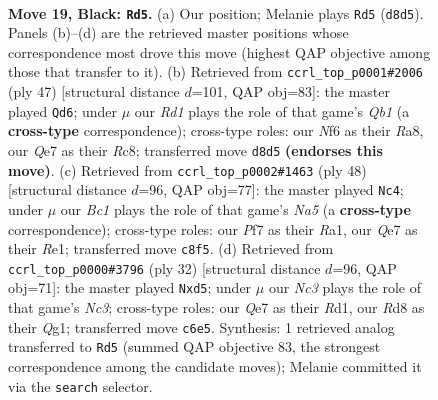\documentclass[11pt]{article}
\begin{document}
\clearpage

\begin{figure}[p]\centering
\begin{subfigure}{0.46\textwidth}\centering
\resizebox{\linewidth}{!}{%
\newchessgame
\chessboard[
  setfen={2br4/1p2qpkp/r1n2np1/p3B1Q1/P7/1P3NP1/5PBP/RN2R1K1 b - - 0 19},
  showmover=false,
  pgfstyle=straightmove, color=movearrow, markmove={d8-d5}
]}
\caption{}
\end{subfigure}\hfill
\begin{subfigure}{0.46\textwidth}\centering
\resizebox{\linewidth}{!}{%
\newchessgame
\chessboard[
  setfen={rqr3k1/4ppbp/2B2np1/p7/1pQB1n2/5N2/PP3PPP/3RR1K1 b - - 5 24},
  showmover=false,
  pgfstyle=straightmove, color=movearrow, markmove={b8-d6}
]}
\caption{}
\end{subfigure}
\\[4pt]
\begin{subfigure}{0.46\textwidth}\centering
\resizebox{\linewidth}{!}{%
\newchessgame
\chessboard[
  setfen={1r2r1k1/1pp2ppp/p4n2/N2Pbq1b/1P6/P1N3P1/3Q1PBP/R3R1K1 w - - 0 25},
  showmover=false,
  pgfstyle=straightmove, color=movearrow, markmove={a5-c4}
]}
\caption{}
\end{subfigure}\hfill
\begin{subfigure}{0.46\textwidth}\centering
\resizebox{\linewidth}{!}{%
\newchessgame
\chessboard[
  setfen={r4rk1/pp3p1p/2n1pnp1/q2b4/5P2/P1N2NP1/1PP1B2P/2KR2QR w - - 0 17},
  showmover=false,
  pgfstyle=straightmove, color=movearrow, markmove={c3-d5}
]}
\caption{}
\end{subfigure}
\caption{\textbf{Move 19, Black: \texttt{Rd5}.} (a) Our position; Melanie plays \texttt{Rd5} (\texttt{d8d5}). Panels (b)--(d) are the retrieved master positions whose correspondence most drove this move (highest QAP objective among those that transfer to it). (b) Retrieved from \texttt{ccrl\_top\_p0001\#2006} (ply 47) [structural distance $d$=101, QAP obj=83]: the master played \texttt{Qd6}; under $\mu$ our \emph{Rd1} plays the role of that game's \emph{Qb1} (a \textbf{cross-type} correspondence); cross-type roles: our \emph{N}f6 as their \emph{R}a8, our \emph{Q}e7 as their \emph{R}c8; transferred move \texttt{d8d5} \textbf{(endorses this move)}. (c) Retrieved from \texttt{ccrl\_top\_p0002\#1463} (ply 48) [structural distance $d$=96, QAP obj=77]: the master played \texttt{Nc4}; under $\mu$ our \emph{Bc1} plays the role of that game's \emph{Na5} (a \textbf{cross-type} correspondence); cross-type roles: our \emph{P}f7 as their \emph{R}a1, our \emph{Q}e7 as their \emph{R}e1; transferred move \texttt{c8f5}. (d) Retrieved from \texttt{ccrl\_top\_p0000\#3796} (ply 32) [structural distance $d$=96, QAP obj=71]: the master played \texttt{Nxd5}; under $\mu$ our \emph{Nc3} plays the role of that game's \emph{Nc3}; cross-type roles: our \emph{Q}e7 as their \emph{R}d1, our \emph{R}d8 as their \emph{Q}g1; transferred move \texttt{c6e5}. Synthesis: 1 retrieved analog transferred to \texttt{Rd5} (summed QAP objective 83, the strongest correspondence among the candidate moves); Melanie committed it via the \texttt{search} selector.}
\label{fig:thought-m37}
\end{figure}
\end{document}
